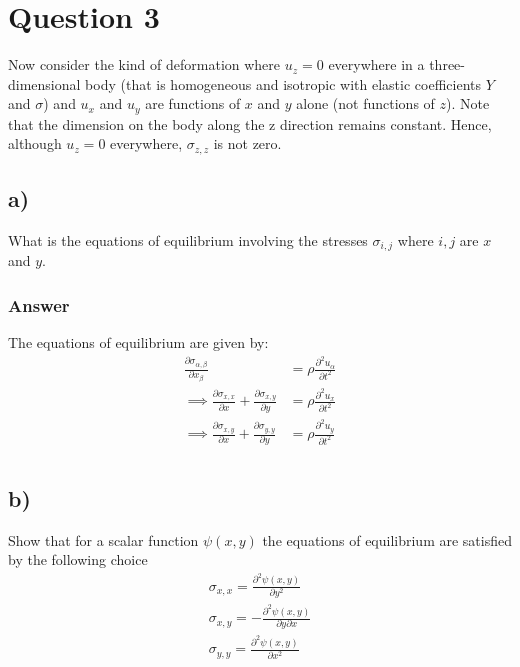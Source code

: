 \documentclass{article}
\begin{document}
\begin{comment}
    \implies \frac{Y}{2(1-2\sigma)}\left(\frac{\partial^2 u_\alpha}{\partial x_\beta^2} + \frac{\partial^2 u_\beta}{\partial x_\alpha\partial x_\beta}\right) &= \rho\frac{\partial^2 u_\alpha}{\partial t^2}\\
    \implies \frac{Y}{2(1-2\sigma)}\left(\frac{\partial^2 u_\alpha}{\partial x_\beta^2} + \frac{\partial^2 u_\beta}{\partial x_\alpha\partial x_\beta}\right) &= \rho\frac{\partial^2 u_\alpha}{\partial t^2}\\
\end{align*}This is the equation of deformation of a small volume in a homogeneous and isotropic material in three dimensions.
\end{comment}
\section*{Question 3}
Now consider the kind of deformation where $u_z = 0$ everywhere in a three-dimensional body (that is homogeneous and isotropic with elastic coefficients $Y$ and $\sigma$) and $u_x$ and $u_y$ are functions of $x$ and $y$ alone (not functions of $z$). Note that the dimension on the body along the z direction remains constant. Hence, although $u_z = 0$ everywhere, $\sigma_{z,z}$ is not zero.
\subsection*{a)}
What is the equations of equilibrium involving the stresses $\sigma_{i,j}$ where $i,j$ are $x$ and $y$.

\subsubsection*{Answer}
The equations of equilibrium are given by:
\begin{align*}
    \frac{\partial \sigma_{\alpha,\beta}}{\partial x_\beta} &= \rho\frac{\partial^2 u_\alpha}{\partial t^2}\\
    \implies \frac{\partial \sigma_{x,x}}{\partial x} + \frac{\partial \sigma_{x,y}}{\partial y} &= \rho\frac{\partial^2 u_x}{\partial t^2}\\
    \implies \frac{\partial \sigma_{x,y}}{\partial x} + \frac{\partial \sigma_{y,y}}{\partial y} &= \rho\frac{\partial^2 u_y}{\partial t^2}\\
\end{align*}


\subsection*{b)}
Show that for a scalar function $\psi(x,y)$ the equations of equilibrium are satisfied by the following choice
\begin{align}
    \sigma_{x,x} = \frac{\partial^2\psi(x,y)}{\partial y^2}\\
    \sigma_{x,y} = -\frac{\partial^2\psi(x,y)}{\partial y\partial x}\\
    \sigma_{y,y} = \frac{\partial^2\psi(x,y)}{\partial x^2}\\
\end{align}
\end{document}
